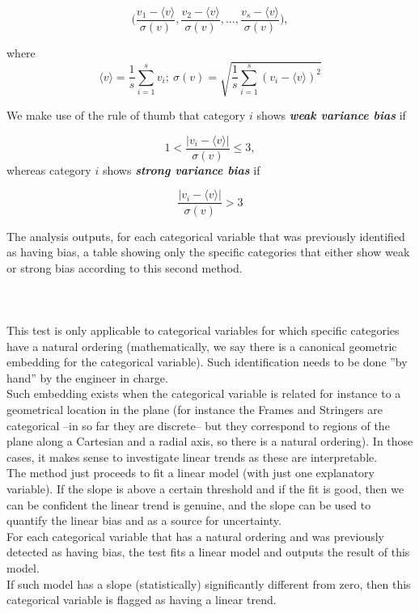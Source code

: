 $$\bigg(\frac{v_1-\langle v \rangle}{\sigma(v)},\frac{v_2-\langle v \rangle}{\sigma(v)},...,\frac{v_s-\langle v \rangle}{\sigma(v)}\bigg),$$

where 
$$\langle v \rangle = \frac{1}{s}\sum_{i=1}^s v_i; \ \sigma(v)=\sqrt{\frac{1}{s}\sum_{i=1}^s (v_i-\langle v\rangle)^2}$$

We make use of the rule of thumb that category $i$ shows \textit{\textbf{weak variance bias}} if 

$$1<\frac{|v_i-\langle v \rangle|}{\sigma(v)}\leq3,$$
whereas category $i$ shows \textit{\textbf{strong variance bias}} if 

$$\frac{|v_i-\langle v \rangle|}{\sigma(v)}>3$$

The analysis outputs, for each categorical variable that was previously identified as having bias, a table showing only the specific categories that either show weak or strong bias according to this second method.

\paragraph{ \\}
This test is only applicable to categorical variables for which specific categories have a natural ordering (mathematically, we say there is a canonical geometric embedding for the categorical variable). Such identification needs to be done ''by hand'' by the engineer in charge.\\
\indent Such embedding exists when the categorical variable is related for instance to a geometrical location in the plane (for instance the Frames and Stringers are categorical --in so far they are discrete-- but they correspond to regions of the plane along a Cartesian and a radial axis, so there is a natural ordering). In those cases, it makes sense to investigate linear trends as these are interpretable.\\
\indent The method just proceeds to fit a linear model (with just one explanatory variable). If the slope is above a certain threshold and if the fit is good, then we can be confident the linear trend is genuine, and the slope can be used to quantify the linear bias and as a source for uncertainty.\\
\indent For each categorical variable that has a natural ordering and was previously detected as having bias, the test fits a linear model and outputs the result of this model.\\
\indent If such model has a slope (statistically) significantly different from zero, then this categorical variable is flagged as having a linear trend.\\
%
